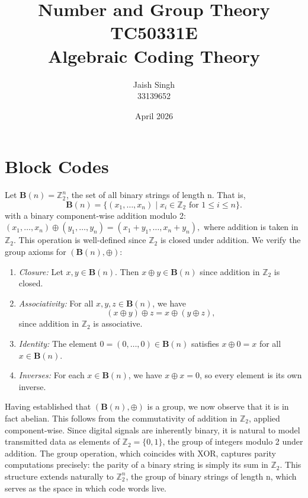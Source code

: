 \documentclass{article}
\title{Number and Group Theory\\\textbf{TC50331E}\\Algebraic Coding Theory}
\author{Jaish Singh\\33139652}
\date{April 2026}
\begin{document}
\maketitle
\setlength{\parskip}{0.5cm}

\section{Block Codes}

Let \( \mathbf{B}(n)=\mathbb{Z}_2^n \), the set of all binary strings of length n. That is,
\[
    \mathbf{B}(n) = \{ (x_1, \dots, x_n) \mid x_i \in \mathbb{Z}_2 \text { for }
  1 \le i \le n \}.
\]
with a binary component-wise addition modulo 2: 
\( (x_1, \dots, x_n) \oplus (y_1, \dots, y_n) = (x_1 + y_1, \dots, x_n + y_n), \)
where addition is taken in $\mathbb{Z}_2$. This operation is well-defined 
since \( \mathbb{Z}_2 \) is closed under addition. We verify the group axioms 
for \((\mathbf{B}(n), \oplus )\):
\begin{enumerate}
    \item \textit{Closure: } Let \( x, y \in \mathbf{B}(n) \). Then \( x \oplus y \in \mathbf{B}(n) \) 
        since addition in \( \mathbb{Z}_2 \) is closed.

    \item \textit{Associativity: } For all \( x, y, z \in \mathbf{B}(n) \), we have
    \[ (x \oplus y) \oplus z = x \oplus (y \oplus z), \] since addition in
    \( \mathbb{Z}_2 \) is associative.

\item \textit{Identity: } The element \( 0 = (0, \dots, 0) \in \mathbf{B}(n) \) satisfies 
    \( x \oplus 0 = x \) for all \( x \in \mathbf{B}(n) \).

\item \textit{Inverses: } For each \( x \in \mathbf{B}(n) \), we have \( x \oplus x = 0 \),
        so every element is its own inverse.
\end{enumerate}
Having established that \( (\mathbf{B}(n), \oplus) \) is a group, we now observe that it is in
fact abelian. This follows from the commutativity of addition in \( \mathbb{Z}_2 \), 
applied component-wise. Since digital signals are inherently binary, it is natural to 
model transmitted data as elements of \(\mathbb{Z}_2 = \{0, 1\}\), the group of integers
modulo 2 under addition. The group operation, which coincides with XOR, captures parity 
computations precisely: the parity of a binary string is simply its sum in \(\mathbb{Z}_2\).
This structure extends naturally to \(\mathbb{Z}_2^n\), the group of binary strings of 
length n, which serves as the space in which code words live. 
\end{document}
